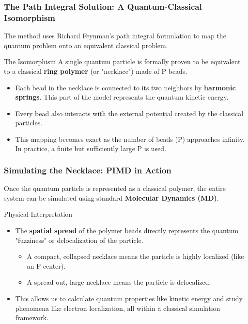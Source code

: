\begin{frame}
  \frametitle{The Path Integral Solution: A Quantum-Classical Isomorphism}
  
  The method uses Richard Feynman's path integral formulation to map the quantum problem onto an equivalent classical problem. \pause
  
  \begin{block}{The Isomorphism}
    A single quantum particle is formally proven to be equivalent to a classical \textbf{ring polymer} (or "necklace") made of P beads.
  \end{block} \pause
  
  \begin{itemize}
    \item Each bead in the necklace is connected to its two neighbors by \textbf{harmonic springs}. This part of the model represents the quantum kinetic energy. \pause
    
    \item Every bead also interacts with the external potential created by the classical particles. \pause
    
    \item This mapping becomes exact as the number of beads (P) approaches infinity. In practice, a finite but sufficiently large P is used.
  \end{itemize}
\end{frame}

\begin{frame}
  \frametitle{Simulating the Necklace: PIMD in Action}
  
  Once the quantum particle is represented as a classical polymer, the entire system can be simulated using standard \textbf{Molecular Dynamics (MD)}. \pause
  
  \begin{alertblock}{Physical Interpretation}
    \begin{itemize}
      \item The \textbf{spatial spread} of the polymer beads directly represents the quantum "fuzziness" or delocalization of the particle. \pause
      \begin{itemize}
          \item A compact, collapsed necklace means the particle is highly localized (like an F center).
          \item A spread-out, large necklace means the particle is delocalized. \pause
      \end{itemize}
      \item This allows us to calculate quantum properties like kinetic energy and study phenomena like electron localization, all within a classical simulation framework.
    \end{itemize}
  \end{alertblock}
  
\end{frame}

